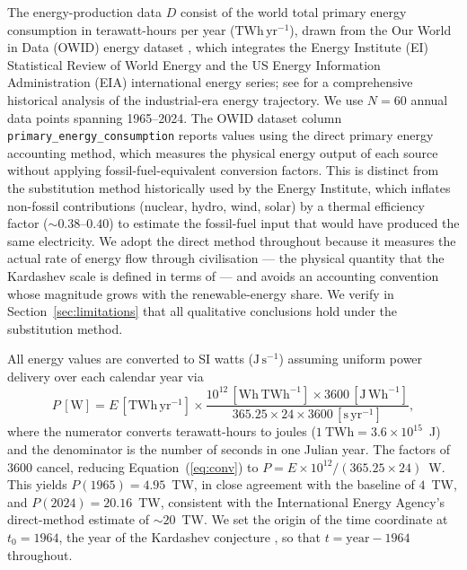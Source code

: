 The energy-production data $D$ consist of the world total primary energy consumption in
terawatt-hours per year ($\mathrm{TWh\,yr^{-1}}$), drawn from the Our World in Data
(OWID) energy dataset \citep{Ritchie2022}, which integrates the Energy Institute (EI)
Statistical Review of World Energy and the US Energy Information Administration (EIA)
international energy series; see \citet{Smil2017} for a comprehensive historical analysis
of the industrial-era energy trajectory. We use $N=60$ annual data points spanning
1965--2024. The OWID dataset column \texttt{primary\_energy\_consumption} reports values
using the direct primary energy accounting method, which measures the physical energy
output of each source without applying fossil-fuel-equivalent conversion factors. This
is distinct from the substitution method historically used by the Energy Institute,
which inflates non-fossil contributions (nuclear, hydro, wind, solar) by a thermal
efficiency factor ($\sim0.38$--$0.40$) to estimate the fossil-fuel input that would have
produced the same electricity. We adopt the direct method throughout because it measures
the actual rate of energy flow through civilisation --- the physical quantity that the
Kardashev scale is defined in terms of --- and avoids an accounting convention whose
magnitude grows with the renewable-energy share. We verify in
Section~\ref{sec:limitations} that all qualitative conclusions hold under the
substitution method.

All energy values are converted to SI watts ($\mathrm{J\,s^{-1}}$) assuming uniform power
delivery over each calendar year via
\begin{equation}
\label{eq:conv}
P\,[\mathrm{W}] = E\,[\mathrm{TWh\,yr^{-1}}] \times
\frac{10^{12}\,[\mathrm{Wh\,TWh^{-1}}] \times 3600\,[\mathrm{J\,Wh^{-1}}]}
     {365.25 \times 24 \times 3600\,[\mathrm{s\,yr^{-1}}]},
\end{equation}
where the numerator converts terawatt-hours to joules ($1~\mathrm{TWh}=3.6\times10^{15}$~J)
and the denominator is the number of seconds in one Julian year. The factors of $3600$
cancel, reducing Equation~(\ref{eq:conv}) to $P = E\times10^{12}/(365.25\times24)$~W.
This yields $P(1965)=4.95$~TW, in close agreement with the \citet{Kardashev1964} baseline
of $4$~TW, and $P(2024)=20.16$~TW, consistent with the International Energy Agency's
direct-method estimate of $\sim20$~TW. We set the origin of the time coordinate at
$t_0=1964$, the year of the Kardashev conjecture \citep{Kardashev1964}, so that
$t=\mathrm{year}-1964$ throughout.

